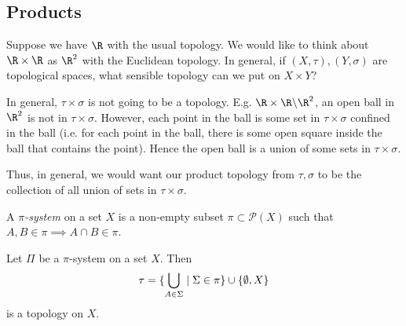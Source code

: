 \subsection{Products}
Suppose we have $\R$ with the usual topology. We would like to think about $\R \times \R$ as $\R^2$ with the Euclidean topology. In general, if $(X,\tau), (Y,\sigma)$ are topological spaces, what sensible topology can we put on $X\times Y$? 

In general, $\tau \times \sigma$ is not going to be a topology. E.g. $\R\times \R \backslash \R^2$, an open ball in $\R^2$ is not in $\tau\times \sigma$. However, each point in the ball is some set in $\tau\times \sigma$ confined in the ball (i.e. for each point in the ball, there is some open square inside the ball that contains the point). Hence the open ball is a union of some sets in $\tau \times \sigma$.

Thus, in general, we would want our product topology from $\tau,\sigma$ to be the collection of all union of sets in $\tau \times\sigma$.

\begin{definition}
A \emph{$\pi$-system} on a set $X$ is a non-empty subset $\pi\subset \mathcal{P}(X)$ such that $A,B\in \pi \implies A\cap B\in \pi$.
\end{definition}

\begin{proposition}                            %
Let $\Pi$ be a $\pi$-system on a set $X$. Then \[\tau = \{\bigcup_{A\in \Sigma}\mid\Sigma\in \pi\} \cup \{\emptyset, X\} \] is a topology on $X$.
\end{proposition}  

